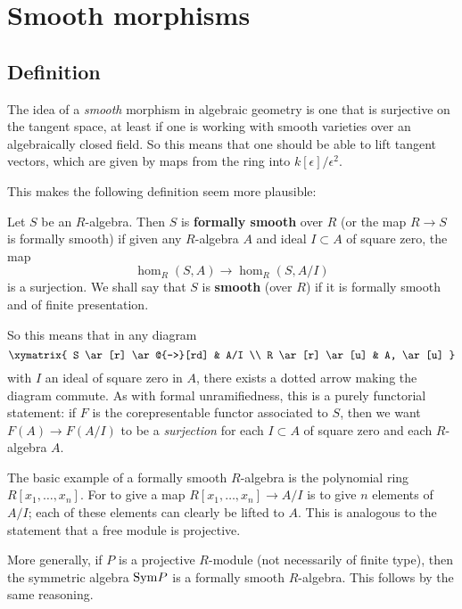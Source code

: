 \section{Smooth morphisms}

\subsection{Definition}
The idea of a \emph{smooth} morphism in algebraic geometry is one that is
surjective on the tangent space, at least if one is working with smooth
varieties over an algebraically closed field. So this means that one should be
able to lift tangent vectors, which are given by maps from the ring into
$k[\epsilon]/\epsilon^2$.

This makes the following definition seem more plausible:

\begin{definition} 
Let $S$ be an $R$-algebra. Then $S$ is \textbf{formally smooth} over $R$ (or
the map $R \to S$ is formally smooth) if given any
$R$-algebra $A$ and ideal $I \subset A $ of square zero, the map
\[ \hom_R(S, A) \to \hom_R(S, A/I)\]
is a surjection.
We shall say that $S$ is \textbf{smooth} (over $R$) if it is formally smooth and of finite
presentation.
\end{definition} 

So this means that in any diagram 
$$
\xymatrix{
S \ar[r] \ar@{-->}[rd] & A/I \\
R \ar[r] \ar[u] & A, \ar[u]
}
$$
with $I$ an ideal of square zero in $A$, there exists a dotted arrow making the diagram commute.
As with formal unramifiedness, this is a purely functorial statement: if $F$ is
the corepresentable functor associated to $S$, then we want $F(A) \to F(A/I)$
to be a \emph{surjection} for each $I \subset A$ of square zero and each
$R$-algebra $A$.


\begin{example}
The basic example of a formally smooth $R$-algebra is the polynomial ring
$R[x_1, \dots, x_n]$. For to give a map $R[x_1, \dots, x_n] \to A/I$ is to give
$n$ elements of $A/I$; each of these elements can clearly be lifted to $A$.
This is analogous to the statement that a free module is projective.

More generally, if $P$ is a projective $R$-module (not necessarily of finite
type), then the symmetric algebra $\mathrm{Sym} P$ is a formally smooth $R$-algebra.
This follows by the same reasoning. 
\end{example}

